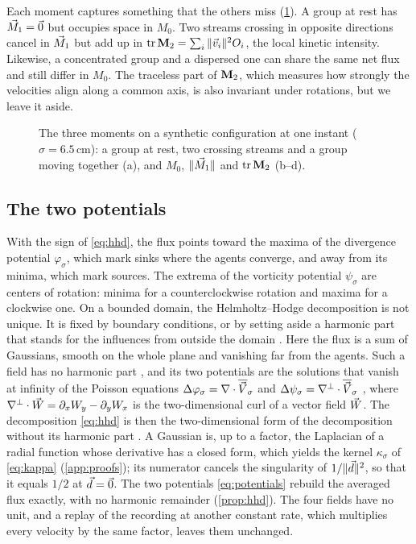 Each moment captures something that the others miss (\cref{fig:moments}). A group at rest has $\vec{M}_1=\vec 0$ but
occupies space in $M_0$. Two streams crossing in opposite directions cancel in $\vec{M}_1$ but add up in
$\operatorname{tr}\mathbf{M}_2=\sum_i\|\vec{v}_i\|^2O_i$, the local kinetic intensity. Likewise, a concentrated group and a
dispersed one can share the same net flux and still differ in $M_0$. The traceless part of $\mathbf{M}_2$, which measures how
strongly the velocities align along a common axis, is also invariant under rotations, but we leave it aside.

\begin{figure}[!htbp]
\centering
{}
\caption{The three moments on a synthetic configuration at one instant ($\sigma=6.5$\,cm): a group at rest, two
crossing streams and a group moving together (a), and $M_0$, $\|\vec{M}_1\|$ and $\operatorname{tr}\mathbf{M}_2$ (b--d).}
\label{fig:moments}
\end{figure}
\FloatBarrier

\subsection{The two potentials}

With the sign of \eqref{eq:hhd}, the flux points toward the maxima of the divergence potential $\varphi_\sigma$, which
mark sinks where the agents converge, and away from its minima, which mark sources. The extrema of the vorticity
potential $\psi_\sigma$ are centers of rotation: minima for a counterclockwise rotation and maxima for a clockwise one.
On a bounded domain, the Helmholtz--Hodge decomposition is not unique. It is fixed by boundary conditions, or by setting
aside a harmonic part that stands for the influences from outside the domain \citep{bhatia2014natural}. Here the flux
is a sum of Gaussians, smooth on the whole plane and vanishing far from the agents. Such a field has no harmonic part
\citep[Section~3.1]{bhatia2013helmholtz}, and its two potentials are the solutions that vanish at infinity of the
Poisson equations $\Delta\varphi_\sigma=\nabla\cdot\overline{\vec{V}}_\sigma$ and $\Delta\psi_\sigma=\nabla^{\perp}\cdot\overline{\vec{V}}_\sigma$
\citep[Eq.~16]{bhatia2013helmholtz}, where $\nabla^{\perp}\cdot\vec{W}=\partial_xW_y-\partial_yW_x$ is the two-dimensional
curl of a vector field $\vec{W}$. The decomposition \eqref{eq:hhd} is then the two-dimensional form of the decomposition
without its harmonic part \citep[Eq.~15]{bhatia2013helmholtz}. A Gaussian is, up to a factor, the Laplacian of a radial
function whose derivative has a closed form, which yields the kernel $\kappa_\sigma$ of \eqref{eq:kappa}
(\cref{app:proofs}); its numerator cancels the singularity of $1/\|\vec{d}\|^2$, so that it equals $1/2$ at $\vec{d}=\vec 0$.
The two potentials \eqref{eq:potentials} rebuild the averaged flux exactly, with no harmonic remainder
(\cref{prop:hhd}). The four fields have no unit, and a replay of the recording at another constant rate, which
multiplies every velocity by the same factor, leaves them unchanged.

